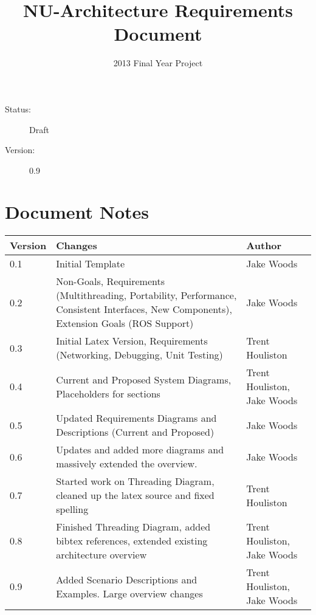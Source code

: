 \documentclass[english,12pt]{scrartcl}
\title{NU-Architecture Requirements Document}
\author{2013 Final Year Project}
\begin{document}
	\maketitle
	\vfill
	{\large
		\begin{description}
			\item [Status:] Draft
			\item [Version:] 0.9
		\end{description}}

	\clearpage
	\listoftodos
	\tableofcontents
	\clearpage

	\section{Document Notes}
		\begin{tabular}{ p{} | p{} | p{} }
			\textbf{Version} & \textbf{Changes} & \textbf{Author} \\
			\hline

			0.1 &
			Initial Template &
			Jake Woods \\
			\hline

			0.2 &
			Non-Goals, Requirements (Multithreading, Portability, Performance, Consistent
			Interfaces, New Components), Extension Goals (ROS Support) &
			Jake Woods \\
			\hline

			0.3 &
			Initial Latex Version, Requirements (Networking, Debugging, Unit Testing) &
			Trent Houliston \\
			\hline

			0.4 &
			Current and Proposed System Diagrams, Placeholders for sections &
			Trent Houliston, Jake Woods \\
			\hline

			0.5 &
			Updated Requirements Diagrams and Descriptions (Current and Proposed) &
			Jake Woods \\
			\hline

			0.6 &
			Updates and added more diagrams and massively extended the overview. &
			Jake Woods \\
			\hline

			0.7 &
			Started work on Threading Diagram, cleaned up the latex source and fixed spelling &
			Trent Houliston \\
			\hline

			0.8 &
			Finished Threading Diagram, added bibtex references, extended existing architecture
			overview &
			Trent Houliston, Jake Woods \\
			\hline
			
			0.9 &
			Added Scenario Descriptions and Examples. Large overview changes &
			Trent Houliston, Jake Woods \\
			\hline
		\end{tabular}
		
\end{document}
